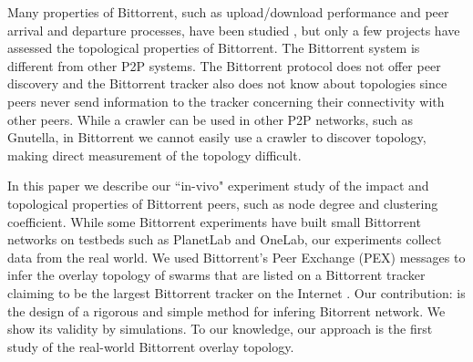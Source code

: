 \documentclass[10pt,conference,letterpaper]{IEEEtran}
\begin{document}
Many properties of Bittorrent, such as upload/download performance and peer arrival and departure processes, have been studied \cite{guo2005measurements}, but only a few projects have assessed the topological properties of Bittorrent.
The Bittorrent system is different from other P2P systems.
The Bittorrent protocol does not offer peer discovery and the Bittorrent tracker also does not know about topologies since peers never send information to the tracker concerning their connectivity with other peers. 
While a crawler can be used in other P2P networks, such as Gnutella, in Bittorrent we cannot easily use a crawler to discover topology, making direct measurement of the topology difficult.

In this paper we describe our ``in-vivo" experiment study of the impact and topological properties of Bittorrent peers, such as node degree and clustering coefficient.  
While some Bittorrent experiments have built small Bittorrent networks on testbeds such as PlanetLab and OneLab, our experiments collect data from the real world. 
We used Bittorrent's Peer Exchange (PEX) messages to infer the overlay topology of swarms that are listed on a Bittorrent tracker claiming to be the largest Bittorrent tracker on the Internet \cite{piratebay}\cite{zhang2010unraveling}.
Our contribution: is the design of a rigorous and simple method for infering Bitorrent network. 
We show its validity by simulations.
To our knowledge, our approach is the first study of the real-world Bittorrent overlay topology.
\end{document}
